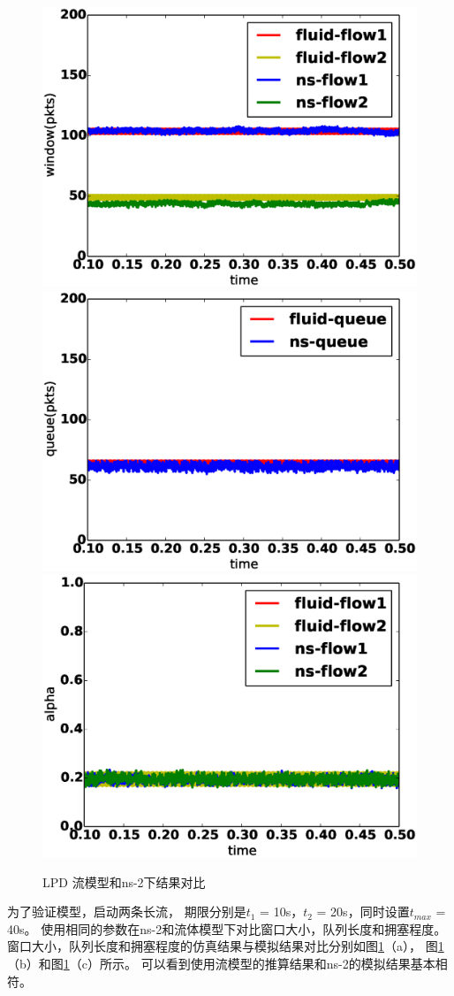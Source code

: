 \begin{figure}[h]
\centering
{}
 {\includegraphics[width=0.32\columnwidth]{figures/LPD/2/window.eps}}
{\includegraphics[width=0.32\columnwidth]{figures/LPD/2/queue.eps}}
\subcaptionbox{$\alpha$}
{\includegraphics[width=0.32\columnwidth]{figures/LPD/2/alpha.eps}}
\caption{LPD 流模型和ns-2下结果对比}
\label{rate-analysis-fig}
\end{figure}


为了验证模型，启动两条长流，
期限分别是$t_1$ = 10s，$t_2$ = 20s，同时设置$t_{max}$ = 40s。
使用相同的参数在ns-2和流体模型下对比窗口大小，队列长度和拥塞程度。
窗口大小，队列长度和拥塞程度的仿真结果与模拟结果对比分别如图\ref{rate-analysis-fig}（a），
图\ref{rate-analysis-fig}（b）和图\ref{rate-analysis-fig}（c）所示。
可以看到使用流模型的推算结果和ns-2的模拟结果基本相符。



